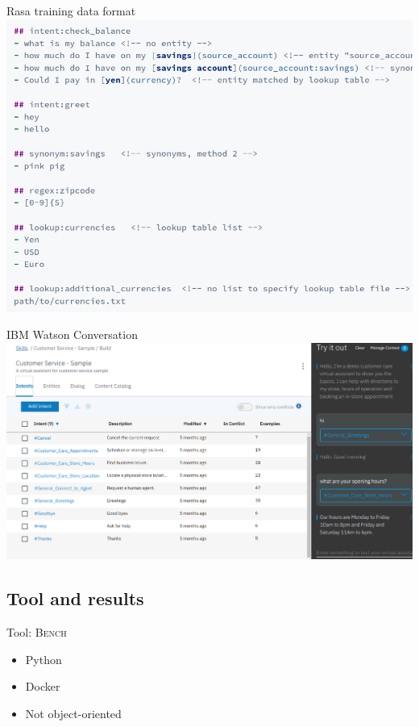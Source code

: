 \documentclass[pdf]{beamer}
\begin{document}
    \begin{frame}{Rasa training data format}
        \includegraphics[width=\textwidth]{figures/rasa_data_format.png}
    \end{frame}

    \begin{frame}{IBM Watson Conversation}
        \hspace*{-1cm}
        \includegraphics[height=0.9\textheight]{figures/watson.png}
    \end{frame}

    \subsection{Tool and results}
    \begin{frame}{Tool: \textsc{Bench}}
        \begin{itemize}
            \item Python
            \item Docker
            \item Not object-oriented\footnotemark
        \end{itemize}
      \end{frame}
      
\end{document}
